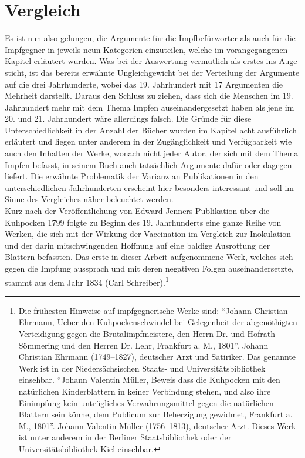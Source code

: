 \documentclass[
    a4paper,
    12pt,
    hyphens,
    chapterprefix=true,
    headheight=33pt,
    footheight=29pt,
    headings=optiontohead,
]{scrartcl}
\begin{document}
{\section{Vergleich}
Es ist nun also gelungen, die Argumente für die Impfbefürworter als auch für die Impfgegner in jeweils neun Kategorien einzuteilen, welche im vorangegangenen Kapitel erläutert wurden. Was bei der Auswertung vermutlich als erstes ins Auge sticht, ist das bereits erwähnte Ungleichgewicht bei der Verteilung der Argumente auf die drei Jahrhunderte, wobei das 19. Jahrhundert mit 17 Argumenten die Mehrheit darstellt. Daraus den Schluss zu ziehen, dass sich die Menschen im 19. Jahrhundert mehr mit dem Thema Impfen auseinandergesetzt haben als jene im 20. und 21. Jahrhundert wäre allerdings falsch. Die Gründe für diese Unterschiedlichkeit in der Anzahl der Bücher wurden im Kapitel acht ausführlich erläutert und liegen unter anderem in der Zugänglichkeit und Verfügbarkeit wie auch den Inhalten der Werke, wonach nicht jeder Autor, der sich mit dem Thema Impfen befasst, in seinem Buch auch tatsächlich Argumente dafür oder dagegen liefert. Die erwähnte Problematik der Varianz an Publikationen in den unterschiedlichen Jahrhunderten erscheint hier besonders interessant und soll im Sinne des Vergleiches näher beleuchtet werden. \\
Kurz nach der Veröffentlichung von Edward Jenners Publikation über die Kuhpocken 1799 folgte zu Beginn des 19. Jahrhunderts eine ganze Reihe von Werken, die sich mit der Wirkung der Vaccination im Vergleich zur Inokulation und der darin mitschwingenden Hoffnung auf eine baldige Ausrottung der Blattern befassten. Das erste in dieser Arbeit aufgenommene Werk, welches sich gegen die Impfung aussprach und mit deren negativen Folgen auseinandersetzte, stammt aus dem Jahr 1834 (Carl Schreiber).\footnote{Die frühesten Hinweise auf impfgegnerische Werke sind: "`Johann Christian Ehrmann, Ueber den Kuhpockenschwindel bei Gelegenheit der abgenöthigten Verteidigung gegen die Brutalimpfmeistere, den Herrn Dr. und Hofrath Sömmering und den Herren Dr. Lehr, Frankfurt a. M., 1801"'. Johann Christian Ehrmann (1749--1827), deutscher Arzt und Satiriker. Das genannte Werk ist in der Niedersächsischen Staats- und Universitätsbibliothek einsehbar. "`Johann Valentin Müller, Beweis dass die Kuhpocken mit den natürlichen Kinderblattern in keiner Verbindung stehen, und also ihre Einimpfung kein untrügliches Verwahrungsmittel gegen die natürlichen Blattern sein könne, dem Publicum zur Beherzigung gewidmet, Frankfurt a. M., 1801"'. Johann Valentin Müller (1756--1813), deutscher Arzt. Dieses Werk ist unter anderem in der Berliner Staatsbibliothek oder der Universitätsbibliothek Kiel einsehbar.}
}
\end{document}
